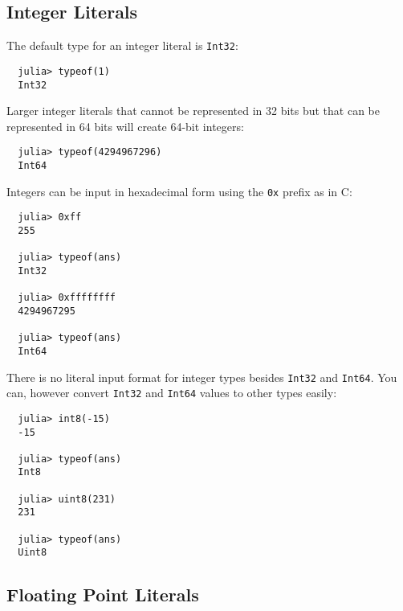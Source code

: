 \documentclass{article}
\begin{document}
\subsection{Integer Literals}

The default type for an integer literal is \verb|Int32|:
\begin{verbatim}
  julia> typeof(1)
  Int32
\end{verbatim}
Larger integer literals that cannot be represented in 32 bits but that can be represented in 64 bits will create 64-bit integers:
\begin{verbatim}
  julia> typeof(4294967296)
  Int64
\end{verbatim}
Integers can be input in hexadecimal form using the \verb|0x| prefix as in C:
\begin{verbatim}
  julia> 0xff
  255

  julia> typeof(ans)
  Int32

  julia> 0xffffffff
  4294967295

  julia> typeof(ans)
  Int64
\end{verbatim}
There is no literal input format for integer types besides \verb|Int32| and \verb|Int64|. You can, however convert \verb|Int32| and \verb|Int64| values to other types easily:
\begin{verbatim}
  julia> int8(-15)
  -15

  julia> typeof(ans)
  Int8

  julia> uint8(231)
  231

  julia> typeof(ans)
  Uint8
\end{verbatim}

\subsection{Floating Point Literals}
\end{document}

